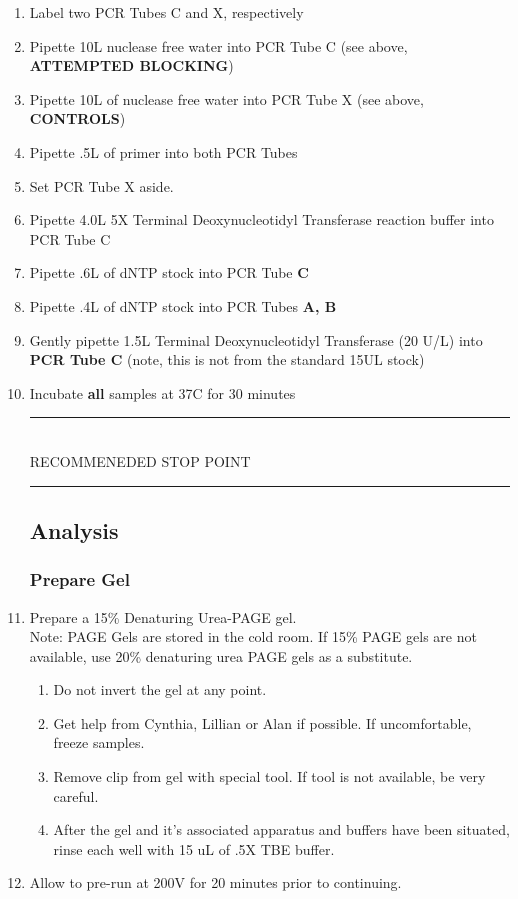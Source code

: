 \documentclass[letterpaper]{article}
\newcommand{\tdt}{Terminal Deoxynucleotidyl Transferase}
\newcommand{\C}{\degree{}C}
\newcommand{\uL}{\micro{}L}
\newcommand{\RstopPoint}{\begin{center}
\rule{0.5\textwidth}{.4pt}\\
\vspace{1mm} 
RECOMMENEDED STOP POINT\\
\rule{0.5\textwidth}{.4pt}
\end{center}}
\begin{document}
\begin{enumerate}
\subsection{Extending}
Based off of our standard \tdt{} extending procedure \cite{genTdT}.
\item{Label two PCR Tubes C and X, respectively}
\item{Pipette 10\uL{} nuclease free water into PCR Tube C (see above, \textbf{ATTEMPTED BLOCKING})}
\item{Pipette 10\uL{} of nuclease free water into PCR Tube X (see above, \textbf{CONTROLS})}
\item{Pipette .5\uL{} of primer into both PCR Tubes}
\item{Set PCR Tube X aside.}
\item{Pipette 4.0\uL{} 5X \tdt{} reaction buffer into PCR Tube C}
\item{Pipette .6\uL{} of dNTP stock into PCR Tube \textbf{C}}
\item{Pipette .4\uL{} of dNTP stock into PCR Tubes \textbf{A, B}}
\item{Gently pipette 1.5\uL{} \tdt{} (20 U/\uL{}) into \textbf{PCR Tube C} (note, this is not from the standard 15U\uL{} stock)}
\item{Incubate \textbf{all} samples at 37\C{} for 30 minutes}\\
\RstopPoint{} 
\subsection{Analysis}

\subsubsection{Prepare Gel}
\item{Prepare a 15\% Denaturing Urea-PAGE gel.}\\
Note: PAGE Gels are stored in the cold room. If 15\% PAGE gels are not available, use 20\% denaturing urea PAGE gels as a substitute.
\begin{enumerate}
\item{Do not invert the gel at any point.}
\item{Get help from Cynthia, Lillian or Alan if possible. If uncomfortable, freeze samples.}
\item{Remove clip from gel with special tool. If tool is not available, be very careful.}
\item{After the gel and it's associated apparatus and buffers have been situated, rinse each well with 15 uL of .5X TBE buffer.}
\end{enumerate}
\item{Allow to pre-run at 200V for 20 minutes prior to continuing.}


\end{enumerate}
\end{document}

